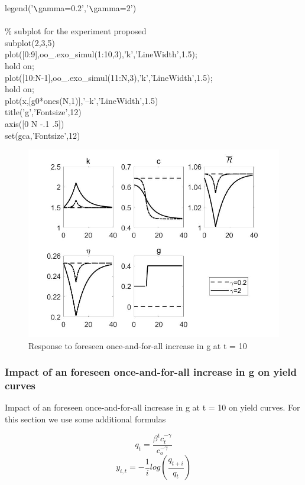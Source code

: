 \documentclass[a4paper,12pt]{scrartcl} %
\begin{document}
{legend('$\verb|\|$gamma=0.2','$\verb|\|$gamma=2')	\\
\\
\% subplot for the experiment proposed\\
subplot(2,3,5)\\
plot([0:9],oo\_.exo\_simul(1:10,3),'k','LineWidth',1.5);\\
hold on;\\
plot([10:N-1],oo\_.exo\_simul(11:N,3),'k','LineWidth',1.5);\\
hold on;\\
plot(x,[g0*ones(N,1)],'--k','LineWidth',1.5)\\
title('g','Fontsize',12)\\
axis([0 N -.1 .5])\\
set(gca,'Fontsize',12)}\\


\begin{figure}[htbp!]
		\centering
			\includegraphics[width=0.8\linewidth]{fig16.jpg}
            \caption{Response to foreseen once-and-for-all increase in g at t = 10}\label{16}
\end{figure}

\subsubsection{Impact of an foreseen once-and-for-all increase in g on yield curves}

Impact of an foreseen once-and-for-all increase in g at t = 10 on yield curves. For this section we use some additional formulas

\begin{equation}\label{20}
    q_t=\frac{\beta^tc_t^{-\gamma}}{c_o^{-\gamma}}
\end{equation}
\begin{equation}\label{21}
    y_{i,t}=-\frac{1}{i}log(\frac{q_{t+i}}{q_t})
\end{equation}
\end{document}
